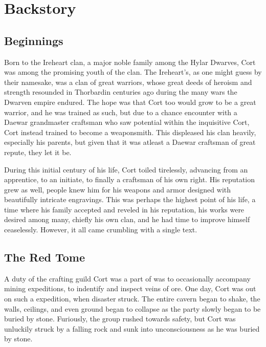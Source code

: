 \documentclass[12pt]{article}
\begin{document}
\section{Backstory}

\subsection{Beginnings}

Born to the Ireheart clan, a major noble family among the Hylar Dwarves, Cort
was among the promising youth of the clan. The Ireheart's, as one might guess by
their namesake, was a clan of great warriors, whose great deeds of heroism and
strength resounded in Thorbardin centuries ago during the many wars the Dwarven
empire endured. The hope was that Cort too would grow to be a great warrior, and
he was trained as such, but due to a chance encounter with a Daewar grandmaster
craftsman who saw potential within the inquisitive Cort, Cort instead trained to
become a weaponsmith. This displeased his clan heavily, especially his parents,
but given that it was atleast a Daewar craftsman of great repute, they let it
be.

During this initial century of his life, Cort toiled tirelessly, advancing from
an apprentice, to an initiate, to finally a craftsman of his own right. His
reputation grew as well, people knew him for his weapons and armor designed with
beautifully intricate engravings. This was perhaps the highest point of his
life, a time where his family accepted and reveled in his reputation, his works
were desired among many, chiefly his own clan, and he had time to improve
himself ceaselessly. However, it all came crumbling with a single text.

\subsection{The Red Tome}

A duty of the crafting guild Cort was a part of was to occasionally accompany
mining expeditions, to indentify and inspect veins of ore. One day, Cort was out
on such a expedition, when disaster struck. The entire cavern began to shake,
the walls, ceilings, and even ground began to collapse as the party slowly began
to be buried by stone. Furiously, the group rushed towards safety, but Cort
was unluckily struck by a falling rock and sunk into unconsciousness as he was
buried by stone.
\end{document}
